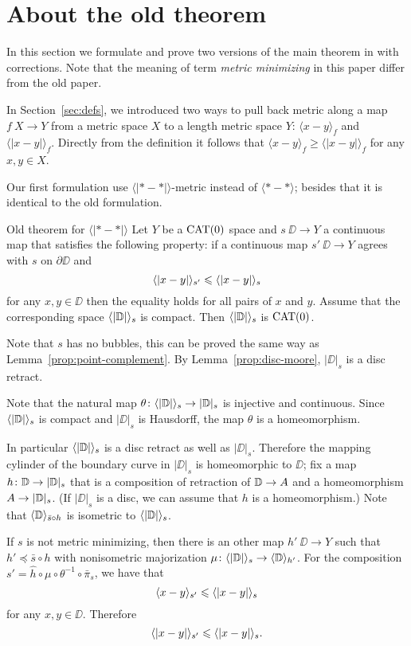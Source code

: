 \section{About the old theorem}\label{sec:old-thm}

In this section we formulate and prove two versions of the main theorem in \cite{petrunin-metric-min} with corrections.
Note that the meaning of term \emph{metric minimizing} in this paper differ from the old paper.

In Section~\ref{sec:defs}, we introduced two ways to pull back metric along a map $f\:X\to Y$ from a metric space $X$ to a length metric space $Y$:
$\langle x-y\rangle_f$ and $\langle| x-y|\rangle_f$.
Directly from the definition it follows that  $\langle x-y\rangle_f\ge \langle| x-y|\rangle_f$ for any $x,y\in X$.

Our first formulation use $\langle|{*}-{*}|\rangle$-metric instead of $\langle{*}-{*}\rangle$; besides that it is identical to the old formulation.

\begin{thm}{Old theorem for $\bm{\langle|{*}-{*}|\rangle}$}
Let $Y$ be a $\mathop{\rm CAT}\nolimits(0)$ space and $s\:\DD\to Y$ a continuous map that satisfies the following property: 
if a continuous map $s'\:\DD\to Y$ agrees with $s$ on $\partial\DD$ and
\[\langle|x-y|\rangle_{s'}\leqslant \langle|x-y|\rangle_{s}\]
for any $x,y\in \DD$
then the equality holds for all pairs of $x$ and $y$.
Assume that the corresponding space $\langle|\mathbb{D}|\rangle_s$ is compact.
Then $\langle|\mathbb{D}|\rangle_s$ is $\mathop{\rm CAT}\nolimits(0)$.
\end{thm}

Note that $s$ has no bubbles, this can be proved the same way as Lemma~\ref{prop:point-complement}.
By Lemma~\ref{prop:disc-moore},  $|\DD|_s$ is a disc retract.

Note that the natural map $\theta\colon\langle|\mathbb{D}|\rangle_s\to |\mathbb{D}|_s$ is injective and continuous.
Since $\langle|\mathbb{D}|\rangle_s$ is compact and $|\DD|_s$ is Hausdorff, the map $\theta$ is a homeomorphism.

In particular $\langle|\mathbb{D}|\rangle_s$ is a disc retract as well as $|\DD|_s$.
Therefore the mapping cylinder of the boundary curve in $|\DD|_s$ is homeomorphic to $\DD$;
fix a map $h\:\DD\zz\to|\DD|_s$ that is a composition of retraction of $\DD\zz\to A$ and a homeomorphism $A\zz\to  |\DD|_s$.
(If $|\DD|_s$ is a disc, we can assume that $h$ is a homeomorphism.)
Note that $\langle\mathbb{D}\rangle_{\bar s\circ h}$ is isometric to $\langle|\mathbb{D}|\rangle_s$.

If $s$ is not metric minimizing,
then there is an other map $h'\:\DD\to Y$ such that $h'\preccurlyeq  \bar s\circ h$ with nonisometric majorization $\mu\colon\langle|\mathbb{D}|\rangle_s\to \langle\mathbb{D}\rangle_{h'}$.
For the composition $s'=\hat h\circ \mu\circ \theta^{-1}\circ \bar \pi_s$, we have that 
\[\langle x-y\rangle_{s'}\leqslant \langle|x-y|\rangle_{s}\]
for any $x,y\in\DD$.
Therefore 
\[\langle|x-y|\rangle_{s'}\leqslant \langle|x-y|\rangle_{s}.\]

